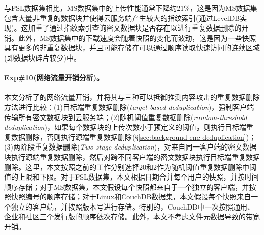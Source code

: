 与FSL数据集相比，MS数据集中的上传性能通常下降约21\%，这是因为MS数据集包含大量非重复的数据块并使得云服务端产生较大的指纹索引(通过LevelDB实现)。这加重了通过指纹索引查询密文数据块是否存在以进行重复数据删除的开销。此外，MS数据集中的下载速度会随着快照的变化而波动，这是因为一些快照具有更多的非重复数据块，并且可能存储在可以通过顺序读取快速访问的连续区域(即数据块碎片较少)中。

\paragraph*{Exp\#10(网络流量开销分析)。}
本文分析了\prototype 的网络流量开销，并将其与三种可以抵御推测内容攻击的重复数据删除方法进行比较：(1)目标端重复数据删除(\textit{target-based deduplication})，强制客户端传输所有密文数据块到云服务端；(2)随机阈值重复数据删除(\textit{random-threshold deduplication})，如果每个数据块的上传次数小于预定义的阈值，则执行目标端重复数据删除，否则执行源端重复数据删除(\S\ref{sec:background-enc-deduplication})；(3)两阶段重复数据删除(\textit{Two-stage deduplication})，对来自同一客户端的密文数据块执行源端重复数据删除，然后对跨不同客户端的密文数据块执行目标端重复数据删除。这里，本文按照之前的工作分别选择20和2作为随机阈值重复数据删除中阈值的上限和下限。对于FSL数据集，本文根据日期合并每个用户的快照，并按时间顺序存储；对于MS数据集，本文假设每个快照都来自于一个独立的客户端，并按照快照编号的顺序存储；对于Linux和CouchDB数据集，本文假设每个快照来自一个独立的客户端，并按照版本号进行存储。特别的，CouchDB中一次按照通用、企业和社区三个发行版的顺序依次存储。此外，本文不考虑文件元数据导致的带宽开销。

